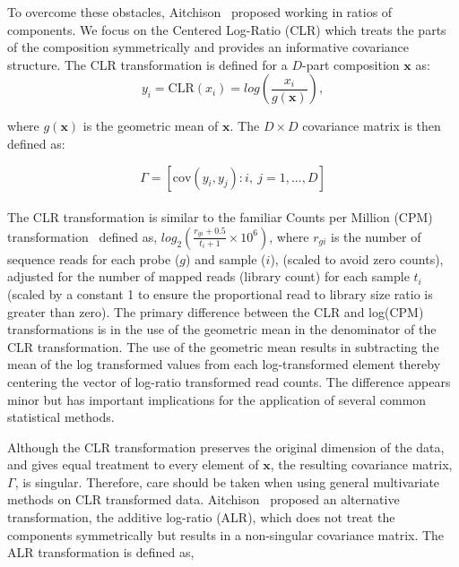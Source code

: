 To overcome these obstacles, Aitchison~\cite{Aitchison1980} proposed working in ratios of components. We focus on the Centered Log-Ratio (CLR) which treats the parts of the composition symmetrically and provides an informative covariance structure.  The CLR transformation is defined for a $D$-part composition $\mathbf{x}$ as:
\begin{equation}
y_i  = \text{CLR}(x_i) = log \left(\frac{x_i}{g(\mathbf{x})} \right),
\label{clr}
\end{equation}

where $g(\mathbf{x})$ is the geometric mean of $\mathbf{x}$.  The $D \times D$ covariance matrix is then defined as:

\begin{equation}
\Gamma = \left[\text{cov}\left(y_i, y_j \right): i,\ j = 1, ..., D \right]
\label{gamma}
\end{equation}
\\

The CLR transformation is similar to the familiar Counts per Million (CPM) transformation~\cite{Law2014} defined as, $log_2 \left(\frac{r_{gi}+0.5}{t_i+1} \times 10^6 \right)$, where $r_{gi}$ is the number of sequence reads for each probe ($g$) and sample ($i$), (scaled to avoid zero counts), adjusted for the number of mapped reads (library count) for each sample $t_i$ (scaled by a constant 1 to ensure the proportional read to library size ratio is greater than zero). The primary difference between the CLR and log(CPM) transformations is in the use of the geometric mean in the denominator of the CLR transformation. The use of the geometric mean results in subtracting the mean of the log transformed values from each log-transformed element thereby centering the vector of log-ratio transformed read counts. The difference appears minor but has important implications for the application of several common statistical methods.


Although the CLR transformation preserves the original dimension of the data, and gives equal treatment to every element of $\mathbf{x}$, the resulting covariance matrix, $\Gamma$, is singular.  Therefore, care should be taken when using general multivariate methods on CLR transformed data. Aitchison~\cite{Aitchison1986} proposed an alternative transformation, the additive log-ratio (ALR), which does not treat the components symmetrically but results in a non-singular covariance matrix.  The ALR transformation is defined as,

